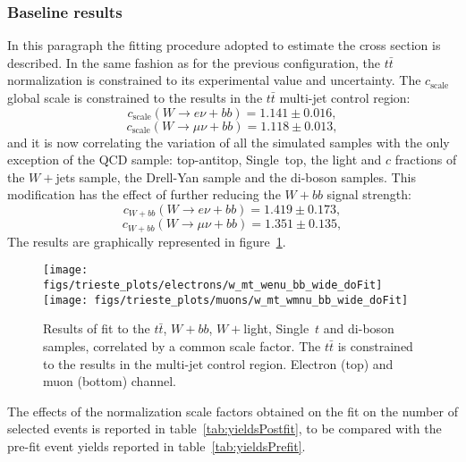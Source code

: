 \subsubsection{Baseline results}
In this paragraph the fitting procedure adopted to estimate the 
cross section is described.
In the same fashion as for the previous configuration, 
the $t\bar{t}$ normalization is constrained to its experimental 
value and uncertainty.
The $c_{\mathrm{scale}}$ global scale is constrained to the 
results in the $t\bar{t}$ multi-jet control region:
$$c_{\mathrm{scale}}(W \rightarrow e \nu + bb) = 1.141 \pm 0.016 \mathrm{,}$$
$$c_{\mathrm{scale}}(W \rightarrow \mu \nu + bb) = 1.118 \pm 0.013 \mathrm{,}$$
and it is now correlating the 
variation of all the simulated samples with the only exception 
of the QCD sample: top-antitop, Single~top, the light and $c$ fractions 
of the $W+$jets sample, the Drell-Yan sample and the di-boson samples.
This modification has the effect of further reducing the 
$W+bb$ signal strength:
$$c_{W+bb}(W \rightarrow e \nu + bb) = 1.419 \pm 0.173 \mathrm{,}$$
$$c_{W+bb}(W \rightarrow \mu \nu + bb) = 1.351 \pm 0.135 \mathrm{,}$$
The results are graphically represented in figure~\ref{fig:baselinefit}.
\begin{figure}[htb]
	\begin{center}
		\leavevmode
		\texttt{[image: figs/trieste\_plots/electrons/w\_mt\_wenu\_bb\_wide\_doFit]}
		\texttt{[image: figs/trieste\_plots/muons/w\_mt\_wmnu\_bb\_wide\_doFit]}
	\end{center}
	\caption{Results of fit to the $t\bar{t}$, $W+bb$, $W+$light, Single~$t$ and 
          di-boson samples, correlated by 
          a common scale factor. The $t\bar{t}$ is constrained to the results 
          in the multi-jet control region. Electron (top) and 
          muon (bottom) channel.}
	\label{fig:baselinefit}
\end{figure}
The effects of the normalization scale factors obtained on the fit 
on the number of selected events is reported in table~\ref{tab:yieldsPostfit}, 
to be compared with the pre-fit event yields reported in 
table~\ref{tab:yieldsPrefit}.
